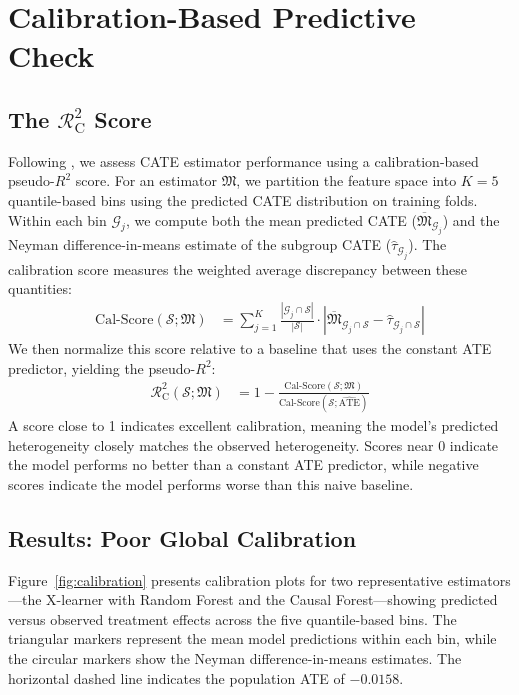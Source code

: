 \documentclass[11pt,a4paper]{article}
\newcommand{\rsquare}{\ensuremath{\mathcal{R}^2_{\mathrm{C}}}}
\begin{document}
\section{Calibration-Based Predictive Check}

\subsection{The $\rsquare$ Score}
Following \citet{dwivedi2020}, we assess CATE estimator performance using a calibration-based pseudo-$R^2$ score. For an estimator $\mathfrak{M}$, we partition the feature space into $K=5$ quantile-based bins using the predicted CATE distribution on training folds. Within each bin $\mathcal{G}_j$, we compute both the mean predicted CATE ($\overline{\mathfrak{M}}_{\mathcal{G}_j}$) and the Neyman difference-in-means estimate of the subgroup CATE ($\widehat{\tau}_{\mathcal{G}_j}$). The calibration score measures the weighted average discrepancy between these quantities:
\begin{align}
	\text{Cal-Score}(\mathcal{S}; \mathfrak{M}) &= \sum_{j=1}^{K} \frac{|\mathcal{G}_j \cap \mathcal{S}|}{|\mathcal{S}|} \cdot \left| \overline{\mathfrak{M}}_{\mathcal{G}_j \cap \mathcal{S}} - \widehat{\tau}_{\mathcal{G}_j \cap \mathcal{S}} \right|
\end{align}
We then normalize this score relative to a baseline that uses the constant ATE predictor, yielding the pseudo-$R^2$:
\begin{align}
	\rsquare(\mathcal{S}; \mathfrak{M}) &= 1 - \frac{\text{Cal-Score}(\mathcal{S}; \mathfrak{M})}{\text{Cal-Score}(\mathcal{S}; \widehat{\text{ATE}})}
\end{align}
A score close to 1 indicates excellent calibration, meaning the model's predicted heterogeneity closely matches the observed heterogeneity. Scores near 0 indicate the model performs no better than a constant ATE predictor, while negative scores indicate the model performs worse than this naive baseline.

\subsection{Results: Poor Global Calibration}
Figure~\ref{fig:calibration} presents calibration plots for two representative estimators---the X-learner with Random Forest and the Causal Forest---showing predicted versus observed treatment effects across the five quantile-based bins. The triangular markers represent the mean model predictions within each bin, while the circular markers show the Neyman difference-in-means estimates. The horizontal dashed line indicates the population ATE of $-0.0158$.
\end{document}
